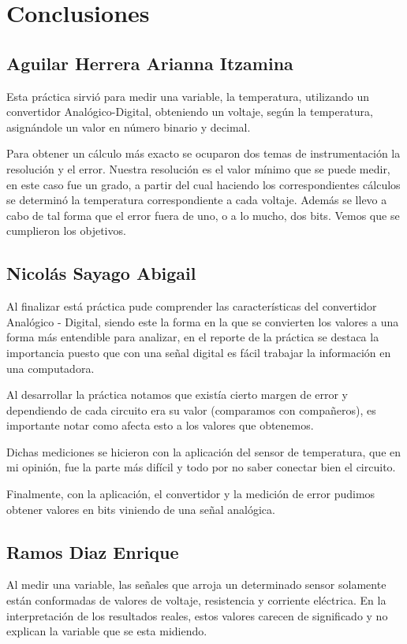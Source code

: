 \documentclass[12pt]{article}
\begin{document}
	\newpage
	\section{Conclusiones}
	    \subsection{Aguilar Herrera Arianna Itzamina}
	    Esta práctica sirvió para medir una variable, la temperatura, utilizando un convertidor Analógico-Digital, obteniendo un voltaje, según la temperatura, asignándole un valor en número binario y decimal. 
	    
	    Para obtener un cálculo más exacto se ocuparon dos temas de instrumentación la resolución y el error. 
	    Nuestra resolución es el valor mínimo que se puede medir, en este caso fue un grado, a partir del cual haciendo los correspondientes cálculos se determinó la temperatura correspondiente a cada voltaje. 
	    Además se llevo a cabo de tal forma que el error fuera de uno, o a lo mucho, dos bits. Vemos que se cumplieron los objetivos.
	    
	    \subsection{Nicolás Sayago Abigail}
	    Al finalizar está práctica pude comprender las características del convertidor Analógico - Digital, siendo este la forma en la que se convierten los valores a una forma más entendible para analizar, en el reporte de la práctica se destaca la importancia puesto que con una señal digital es fácil trabajar la información en una computadora. 
	    
	    Al desarrollar la práctica notamos que existía cierto margen de error y dependiendo de cada circuito era su valor (comparamos con compañeros), es importante notar como afecta esto a los valores que obtenemos.
	    
	    Dichas mediciones se hicieron con la aplicación del sensor de temperatura, que en mi opinión, fue la parte más difícil y todo por no saber conectar bien el circuito.
	    
	    Finalmente, con la aplicación, el convertidor y la medición de error pudimos obtener valores en bits viniendo de una señal analógica.
	    
	    
	    \subsection{Ramos Diaz Enrique}
	    Al medir una variable, las señales que arroja un determinado sensor solamente están conformadas de valores de voltaje, resistencia y corriente eléctrica. En la interpretación de los resultados reales, estos valores carecen de significado y no explican la variable que se esta midiendo.
	    
\end{document}

